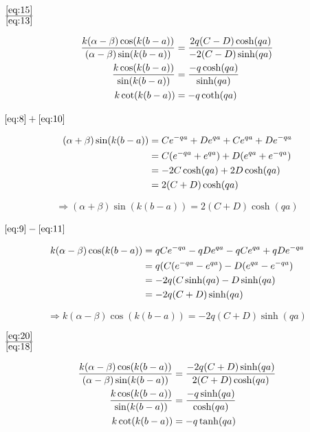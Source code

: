 \( \frac{\eqref{eq:15}}{ \eqref{eq:13} } \)

\begin{align} 
\frac{k(\alpha-\beta)\cos(k(b-a))}{(\alpha-\beta)\sin(k(b-a)) }&=  \frac{2q(C-D)\cosh(qa)}{-2(C-D)\sinh(qa) } \notag \\
\frac{k\cos(k(b-a))}{\sin(k(b-a)) }&=  \frac{-q\cosh(qa)}{\sinh(qa) } \notag \\
k\cot(k(b-a)) &= - q\coth(qa) \label{eq:16}
\end{align}


\( \eqref{eq:8}+\eqref{eq:10}  \)

\begin{align}
  \label{eq:17}
  (\alpha+\beta)\sin(k(b-a)) &= Ce^{-qa}+De^{qa}+ Ce^{qa}+De^{-qa}  \notag\\
&= C(e^{-qa}+ e^{qa})+D(e^{qa}+e^{-qa}) \notag \\
&=-2C\cosh(qa)+2D\cosh(qa) \notag \\
&=2(C+D)\cosh(qa)
\end{align}

\begin{equation}
  \label{eq:18}
 \Rightarrow  (\alpha+\beta)\sin(k(b-a))=2(C+D)\cosh(qa)
\end{equation}

\( \eqref{eq:9}-\eqref{eq:11}  \)

\begin{align}
  \label{eq:19}
  k(\alpha-\beta)\cos(k(b-a)) &= qCe^{-qa}-qDe^{qa}- qCe^{qa}+qDe^{-qa} \notag \\
&= q(C(e^{-qa}- e^{qa})-D(e^{qa}-e^{-qa})  \notag\\
&= -2q(C\sinh(qa)-D\sinh(qa)  \notag\\
&=-2q(C+D)\sinh(qa)
\end{align}

\begin{equation}
  \label{eq:20}
 \Rightarrow  k(\alpha-\beta)\cos(k(b-a))=-2q(C+D)\sinh(qa)
\end{equation}


\( \frac{\eqref{eq:20}}{ \eqref{eq:18} } \)

\begin{align}
\frac{k(\alpha-\beta)\cos(k(b-a))}{(\alpha-\beta)\sin(k(b-a)) }&=  \frac{-2q(C+D)\sinh(qa)}{2(C+D)\cosh(qa) }  \notag\\
\frac{k\cos(k(b-a))}{\sin(k(b-a)) }&= \frac{-q\sinh(qa)}{\cosh(qa) } \notag \\
k\cot(k(b-a)) &= -q \tanh(qa) \label{eq:21}
\end{align}


